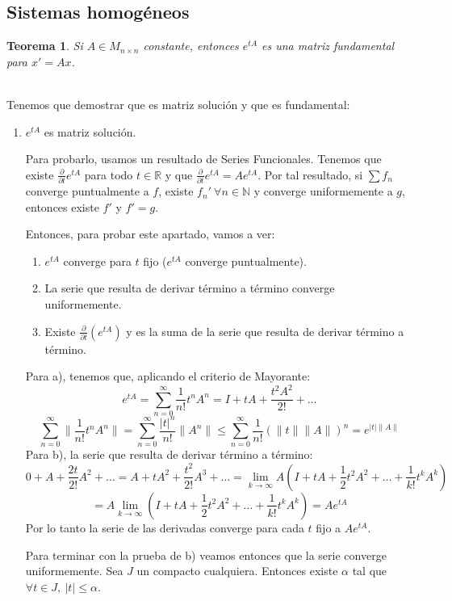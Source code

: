 \documentclass{article}
\makeatletter
\providecommand{\norm}[1]{\lVert#1\rVert}
\providecommand{\abs}[1]{\lvert#1\rvert}
\theoremstyle{theorem-style}  %
\newtheorem{theorem}{Teorema}[section]  %
\theoremstyle{definition-style}
\theoremstyle{example-style}
\renewenvironment{proof}[1][\proofname]{\par
	\pushQED{\qed}%
	\normalfont \topsep6\p@\@plus6\p@\relax
	\list{}{%
		\settowidth{\leftmargin}{\quad:\hskip\labelsep}%
		\setlength{\labelwidth}{0pt}%
		\setlength{\itemindent}{-\leftmargin}%
	}%
	\item[\hskip\labelsep\itshape#1\@addpunct{:}]\ignorespaces
}{%
	\popQED\endlist\@endpefalse
}
\makeatother
\begin{document}
\subsection{Sistemas homogéneos}
\begin{theorem}
	Si $ A\in M_{n\times n} $ constante, entonces $ e^{tA} $ es una matriz fundamental para $ x'=Ax $.
\end{theorem}
\begin{proof} \ \\
	Tenemos que demostrar que es matriz solución y que es fundamental:
	\begin{enumerate}[\quad i)]
		\item $ e^{tA} $ es matriz solución. 
		
		Para probarlo, usamos un resultado de Series Funcionales. Tenemos que existe $ \frac{\partial}{\partial t}e^{tA}$ para todo $t \in \mathbb{R} $ y que $ \frac{\partial}{\partial t}e^{tA}=Ae^{tA} $. Por tal resultado, si $ \sum f_n $ converge puntualmente a $ f $, existe $ f_n'\ \forall n \in \mathbb{N} $ y converge uniformemente a $ g $, entonces existe $ f' $ y $ f'=g $.
		
		Entonces, para probar este apartado, vamos a ver:
		\begin{enumerate}[\quad a)]
			\item $ e^{tA} $ converge para $ t $ fijo ($ e^{tA} $ converge puntualmente).
			\item La serie que resulta de derivar término a término converge uniformemente.
			\item Existe $ \frac{\partial}{\partial t} (e^{tA}) $ y es la suma de la serie que resulta de derivar término a término.
		\end{enumerate}
		Para a), tenemos que, aplicando el criterio de Mayorante:
		\[ e^{tA}=\sum_{n=0}^{\infty} \frac{1}{n!}t^nA^n=I+tA+\frac{t^2A^2}{2!}+\dots \]
		\[ \sum_{n=0}^{\infty} \norm{\frac{1}{n!}t^nA^n}=\sum_{n=0}^{\infty} \frac{\abs{t}^n}{n!}\norm{A^n}\leq \sum_{n=0}^{\infty} \frac{1}{n!}(\norm{t}\norm{A})^n = e^{\abs{t}\norm{A}}\]
		Para b), la serie que resulta de derivar término a término:
		\[ 0+A+ \frac{2t}{2!}A^2+\dots =A+tA^2+\frac{t^2}{2!}A^3+\dots =\lim\limits_{k\to\infty} A(I+tA+\frac{1}{2}t^2A^2+\dots+\frac{1}{k!}t^kA^k)
		\]
		\[=A\lim\limits_{k\to\infty} (I+tA+\frac{1}{2}t^2A^2+\dots+\frac{1}{k!}t^kA^k) = Ae^{tA} \]
		Por lo tanto la serie de las derivadas converge para cada $ t $ fijo a $ Ae^{tA} $.
		
		Para terminar con la prueba de b) veamos entonces que la serie converge uniformemente. Sea $ J $ un compacto cualquiera. Entonces existe $ \alpha $ tal que $ \forall t \in J, \ \abs{t}\leq \alpha$.
		

\end{enumerate}
\end{proof}
\end{document}
